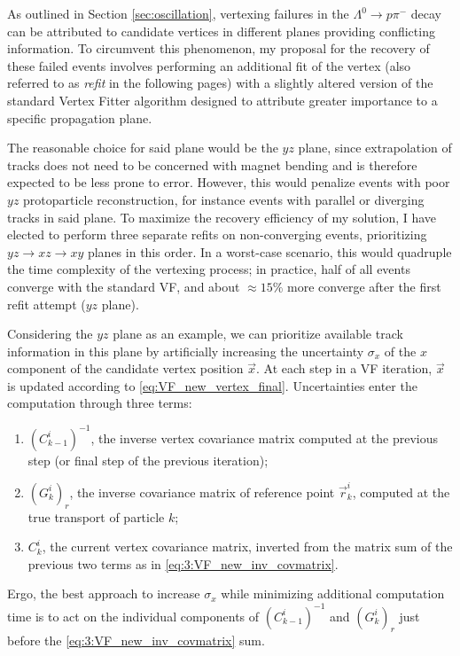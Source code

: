 As outlined in Section \ref{sec:oscillation}, vertexing failures in the $\Lambda^0 \rightarrow p\pi^-$ decay can be attributed to candidate vertices in different planes providing conflicting information.
To circumvent this phenomenon, my proposal for the recovery of these failed events involves performing an additional fit of the vertex (also referred to as \textit{refit} in the following pages) with a slightly altered version of the standard Vertex Fitter algorithm designed to attribute greater importance to a specific propagation plane.

The reasonable choice for said plane would be the $yz$ plane, since extrapolation of tracks does not need to be concerned with magnet bending and is therefore expected to be less prone to error.
However, this would penalize events with poor $yz$ protoparticle reconstruction, for instance events with parallel or diverging tracks in said plane.
To maximize the recovery efficiency of my solution, I have elected to perform three separate refits on non-converging events, prioritizing $yz \rightarrow xz \rightarrow xy$ planes in this order.
In a worst-case scenario, this would quadruple the time complexity of the vertexing process; in practice, half of all events converge with the standard VF, and about $\approx 15\%$ more converge after the first refit attempt ($yz$ plane).

Considering the $yz$ plane as an example, we can prioritize available track information in this plane by artificially increasing the uncertainty $\sigma_x$ of the $x$ component of the candidate vertex position $\vec{x}$.
At each step in a VF iteration, $\vec{x}$ is updated according to \eqref{eq:VF_new_vertex_final}.
Uncertainties enter the computation through three terms:
\begin{enumerate}
	\item ${(C_{k-1}^i)}^{-1}$, the inverse vertex covariance matrix computed at the previous step (or final step of the previous iteration);
	\item ${(G_k^i)}_r$, the inverse covariance matrix of reference point $\vec{r}_k^i$, computed at the true transport of particle $k$;
	\item $C_k^i$, the current vertex covariance matrix, inverted from the matrix sum of the previous two terms as in \eqref{eq:3:VF_new_inv_covmatrix}.
\end{enumerate}
Ergo, the best approach to increase $\sigma_x$ while minimizing additional computation time is to act on the individual components of ${(C_{k-1}^i)}^{-1}$ and ${(G_k^i)}_r$ just before the \eqref{eq:3:VF_new_inv_covmatrix} sum.

